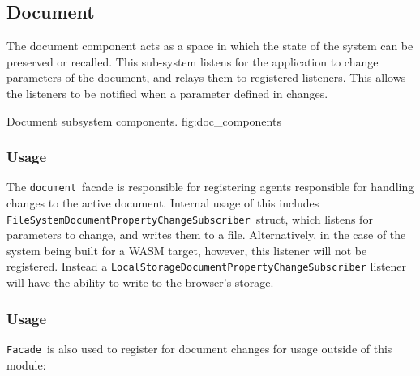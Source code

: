 \newcommand{\dmod}{\texttt{document}}
\newcommand{\dftype}{\texttt{Facade}}
\newcommand{\dffspcstype}{\texttt{FileSystemDocumentPropertyChangeSubscriber}}
\newcommand{\dflspcstype}{\texttt{LocalStorageDocumentPropertyChangeSubscriber}}

\subsection{Document}
The document component acts as a space in which the state of the system can be preserved or recalled.
This sub-system listens for the application to change parameters of the document, and relays them to registered listeners.
This allows the listeners to be notified when a parameter defined in  changes.

{Document subsystem components.}
{fig:doc_components}


\subsubsection{Usage}
The \dmod\ facade is responsible for registering agents responsible for handling changes to the active document.
Internal usage of this includes \dffspcstype\ struct, which listens for parameters to change, and writes them to a file.
Alternatively, in the case of the system being built for a WASM target, however, this listener will not be registered.
Instead a \dflspcstype{} listener will have the ability to write to the browser's storage.


\subsubsection{Usage}
\dftype\ is also used to register for document changes for usage outside of this module:
\begin{itemize}
\end{itemize}



